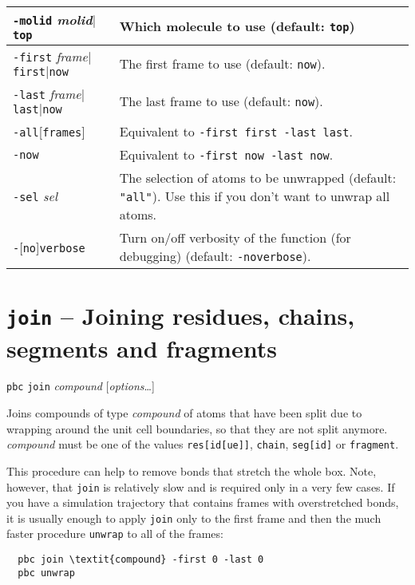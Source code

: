 \documentclass[a4paper, DIV12]{scrartcl}
\begin{document}
\begin{tabular}{|p{}|p{}|}
\hline

\texttt{-molid} \textit{molid}$|$\texttt{top}
& Which molecule to use (default: \texttt{top})
\\ \hline

\texttt{-first} \textit{frame}$|$\texttt{first}$|$\texttt{now}
& The first frame to use (default: \texttt{now}).
\\ \hline

\texttt{-last} \textit{frame}$|$\texttt{last}$|$\texttt{now}
& The last frame to use (default: \texttt{now}).
\\ \hline

\texttt{-all}[\texttt{frames}]
& Equivalent to \texttt{-first first -last last}.
\\ \hline

\texttt{-now}
& Equivalent to \texttt{-first now -last now}.
\\ \hline

\texttt{-sel} \textit{sel}
& The selection of atoms to be unwrapped (default: \texttt{"all"}). Use
this if you don't want to unwrap all atoms.
\\ \hline

\texttt{-}[\texttt{no}]\texttt{verbose}
& Turn on/off verbosity of the function (for debugging) (default:
\texttt{-noverbose}).
\\ \hline
\end{tabular}


\newpage
\section{\texttt{join} -- Joining residues, chains, segments and
  fragments}
\label{sec:join}


\texttt{pbc} \texttt{join} \textit{compound} [\textit{options}\dots]


Joins compounds of type \textit{compound} of atoms that have been
split due to wrapping around the unit cell boundaries, so that they
are not split anymore. \textit{compound} must be one of the values
\texttt{res[id[ue]]}, \texttt{chain}, \texttt{seg[id]} or
\texttt{fragment}.

This procedure can help to remove bonds that stretch the whole box.
Note, however, that \texttt{join} is relatively slow and is required
only in a very few cases.  If you have a simulation trajectory that
contains frames with overstretched bonds, it is usually enough to
apply \texttt{join} only to the first frame and then the much faster
procedure \texttt{unwrap} to all of the frames:
\begin{Verbatim}
  pbc join \textit{compound} -first 0 -last 0 
  pbc unwrap
\end{Verbatim}
\end{document}
